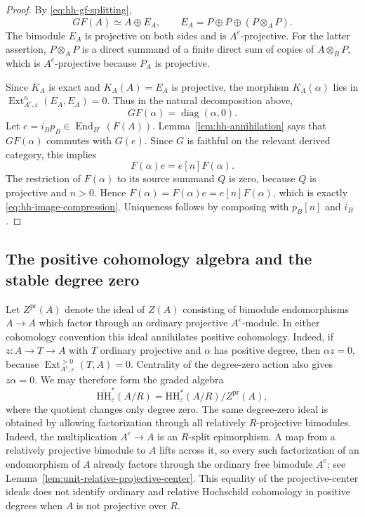 \documentclass[12pt,a4paper,english,reqno]{amsart}
\numberwithin{equation}{section}
\theoremstyle{plain}
\theoremstyle{definition}
\begin{document}
\begin{proof}
By \eqref{eq:hh-gf-splitting},
\[
 GF(A)\simeq A\oplus E_A,
 \qquad E_A=P\oplus P\oplus(P\otimes_AP).
\]
The bimodule $E_A$ is projective on both sides and is
$A^e$-projective.  For the latter assertion, $P\otimes_AP$ is a
direct summand of a finite direct sum of copies of $A\otimes_RP$,
which is $A^e$-projective because $P_A$ is projective.

Since $K_A$ is exact and $K_A(A)=E_A$ is projective, the morphism
$K_A(\alpha)$ lies in
$\operatorname{Ext}_{A^e,\varepsilon}^n(E_A,E_A)=0$.
Thus in the natural decomposition above,
\[
 GF(\alpha)=\operatorname{diag}(\alpha,0).
\]
Let $e=i_Bp_B\in\operatorname{End}_{B^e}(F(A))$.
Lemma~\ref{lem:hh-annihilation} says that $GF(\alpha)$ commutes
with $G(e)$.  Since $G$ is faithful on the relevant derived
category, this implies
\[
 F(\alpha)e=e[n]F(\alpha).
\]
The restriction of $F(\alpha)$ to its source summand $Q$ is zero,
because $Q$ is projective and $n>0$.  Hence
$F(\alpha)=F(\alpha)e=e[n]F(\alpha)$, which is exactly
\eqref{eq:hh-image-compression}.  Uniqueness follows by composing
with $p_B[n]$ and $i_B$.
\end{proof}

\subsection{The positive cohomology algebra and the stable degree zero}

Let $Z^{\mathrm{pr}}(A)$ denote the ideal of $Z(A)$ consisting of
bimodule endomorphisms $A\to A$ which factor through an ordinary
projective $A^e$-module.  In either cohomology convention this ideal
annihilates positive cohomology.  Indeed, if
$z:A\to T\to A$ with $T$ ordinary projective and $\alpha$ has
positive degree, then $\alpha z=0$, because
$\operatorname{Ext}_{A^e,\varepsilon}^{>0}(T,A)=0$.
Centrality of the degree-zero action also gives $z\alpha=0$.
We may therefore form the graded algebra
\begin{equation}
 \overline{\mathrm{HH}}_{\varepsilon}^{*}(A/R)
   =\mathrm{HH}_{\varepsilon}^{*}(A/R)/Z^{\mathrm{pr}}(A),
 \label{eq:hh-stable-ring}
\end{equation}
where the quotient changes only degree zero.
The same degree-zero ideal is obtained by allowing factorization
through all relatively $R$-projective bimodules.  Indeed, the
multiplication $A^e\to A$ is an $R$-split epimorphism.  A map from a
relatively projective bimodule to $A$ lifts across it, so every such
factorization of an endomorphism of $A$ already factors through
the ordinary free bimodule $A^e$; see
Lemma~\ref{lem:unit-relative-projective-center}.
This equality of the projective-center ideals does not identify
ordinary and relative Hochschild cohomology in positive degrees
when $A$ is not projective over $R$.
\end{document}
